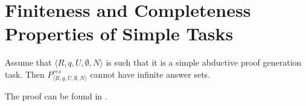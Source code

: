 \section{Finiteness and Completeness Properties of Simple Tasks}

\begin{theorem}[Finiteness]\label{thm:finiteness}
Assume that $\langle R,q,U,\emptyset,N \rangle$ is such that it is a simple abductive proof generation task. %
Then $P_{\langle R,q,U,\emptyset,N \rangle}^{res}$ cannot have infinite answer sets. 
\end{theorem}

The proof can be found in \cite{extended_version}.


